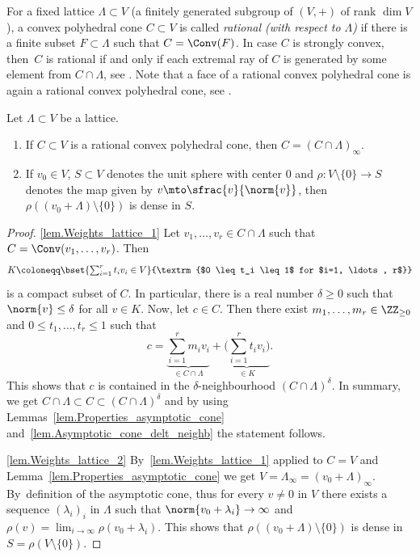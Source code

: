 For a fixed lattice $\Lambda \subset V$ (\ie a finitely generated subgroup of $(V, +)$ of rank $\dim V$),
a convex polyhedral cone $C \subset V$
is called \emph{rational (with respect to $\Lambda$)} if there is a finite subset $F \subset \Lambda$
such that $C = \Conv(F)$. In case $C$ is strongly convex, then~$C$ is rational if and only if
each extremal ray of $C$ is generated
by some element from $C \cap \Lambda$, see \cite[p.\,14]{Fu1993Introduction-to-to}.
Note that a face of a rational convex polyhedral cone
is again a rational convex polyhedral cone, see \cite[Prop.\,2]{Fu1993Introduction-to-to}.

\begin{lemma}
\label{lem.Weights_lattice}
Let $\Lambda \subset V$ be a lattice.
\begin{enumerate}
\item \label{lem.Weights_lattice_1} If $C \subset V$ is a rational convex
polyhedral cone, then $C = (C \cap \Lambda)_{\infty}$.
\item \label{lem.Weights_lattice_2} If $v_0 \in V$, $S \subset V$ denotes the unit sphere with center $0$ and
$\rho \colon V \setminus \{0\} \to S$ denotes the map given by $v \mto \sfrac{v}{\norm{v}}$,
then $\rho((v_0 + \Lambda) \setminus \{0\})$ is dense in $S$.
\end{enumerate}
\end{lemma}

\skpt
\begin{proof}
\eqref{lem.Weights_lattice_1}
Let $v_1, \ldots, v_r \in C \cap \Lambda$ such that $C = \Conv(v_1, \ldots, v_r)$. Then
\[
K\coloneqq\bset{\textstyle\sum_{i=1}^r t_i v_i \in V}{\textrm{$0 \leq t_i \leq 1$ for $i=1, \ldots, r$}}
\]
is a compact subset of $C$. In particular, there is a real number $\delta \geq 0$ such that
$\norm{v} \leq \delta$ for all $v \in K$. Now, let $c \in C$. Then there exist
$m_1, \ldots, m_r \in \ZZ_{\geq 0}$ and $0 \leq t_1, \ldots, t_r \leq 1$ such that
\[
c = \underbrace{\sum_{i=1}^r m_i v_i}_{\in C \cap \Lambda} +
\underbrace{\biggl(\sum_{i=1}^r t_i v_i \biggr)}_{\in K}.
\]
This shows that $c$ is contained in the $\delta$-neighbourhood $(C \cap \Lambda)^\delta$. In
summary, we get $C \cap \Lambda \subset C \subset (C \cap \Lambda)^\delta$ and by
using Lemmas~\ref{lem.Properties_asymptotic_cone} and~\ref{lem.Asymptotic_cone_delt_neighb}
the statement follows.

\eqref{lem.Weights_lattice_2}
By~\eqref{lem.Weights_lattice_1} applied to $C = V$ and
Lemma~\ref{lem.Properties_asymptotic_cone} we get
$V = \Lambda_{\infty} = (v_0 + \Lambda)_{\infty}$. By~definition of the asymptotic cone, thus
for every $v \neq 0$ in $V$ there exists a sequence $(\lambda_i)_i$ in $\Lambda$ such that
$\norm{v_0 + \lambda_i} \to \infty$ and
$\rho(v) = \lim_{i \to \infty} \rho(v_0 + \lambda_i)$.
This shows that $\rho((v_0 + \Lambda) \setminus \{0\})$ is dense in $S = \rho(V \setminus \{0\})$.
\end{proof}

